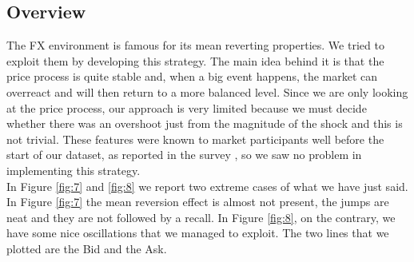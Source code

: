 \documentclass[a4paper]{article}
\begin{document}
\subsection{Overview}

The FX environment is famous for its mean reverting properties. We tried to exploit them by developing this strategy. The main idea behind it is that the price process is quite stable and, when a big event happens, the market can overreact and will then return to a more balanced level. Since we are only looking at the price process, our approach is very limited because we must decide whether there was an overshoot just from the magnitude of the shock and this is not trivial. These features were known to market participants well before the start of our dataset, as reported in the survey \cite{cheung_currency_2001}, so we saw no problem in implementing this strategy.\\
In Figure \ref{fig:7} and \ref{fig:8} we report two extreme cases of what we have just said. In Figure \ref{fig:7} the mean reversion effect is almost not present, the jumps are neat and they are not followed by a recall. In Figure \ref{fig:8}, on the contrary, we have some nice oscillations that we managed to exploit. The two lines that we plotted are the Bid and the Ask.
\end{document}
